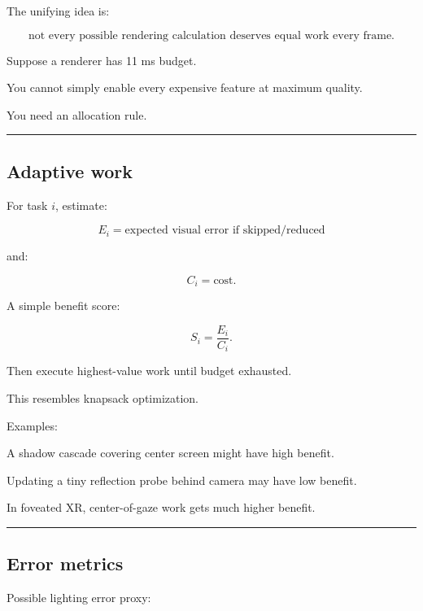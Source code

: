 The unifying idea is:

\[
\boxed{
\text{not every possible rendering calculation deserves equal work every frame}.
}
\]

Suppose a renderer has 11 ms budget.

You cannot simply enable every expensive feature at maximum quality.

You need an allocation rule.

\begin{center}\rule{0.5\linewidth}{0.5pt}\end{center}

\subsection{Adaptive work}\label{04-visual-computing-ii-ch040-adaptive-work}

\hypertarget{04-visual-computing-ii-ch040-adaptive-work}{}

For task \(i\), estimate:

\[
E_i=
\text{expected visual error if skipped/reduced}
\]

and:

\[
C_i=
\text{cost}.
\]

A simple benefit score:

\[
\boxed{
S_i=
\frac{E_i}{C_i}.
}
\]

Then execute highest-value work until budget exhausted.

This resembles knapsack optimization.

Examples:

A shadow cascade covering center screen might have high benefit.

Updating a tiny reflection probe behind camera may have low benefit.

In foveated XR, center-of-gaze work gets much higher benefit.

\begin{center}\rule{0.5\linewidth}{0.5pt}\end{center}

\subsection{Error metrics}\label{04-visual-computing-ii-ch040-error-metrics}

\hypertarget{04-visual-computing-ii-ch040-error-metrics}{}

Possible lighting error proxy:

